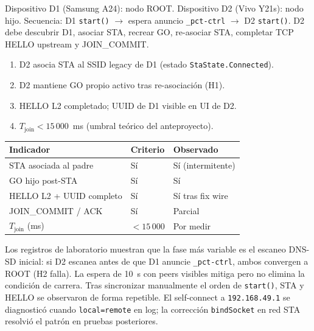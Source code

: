 

Dispositivo D1 (Samsung A24): nodo ROOT. Dispositivo D2 (Vivo Y21s): nodo hijo. Secuencia: D1 \texttt{start()} $\rightarrow$ espera anuncio \texttt{\_pct-ctrl} $\rightarrow$ D2 \texttt{start()}. D2 debe descubrir D1, asociar STA, recrear GO, re-asociar STA, completar TCP HELLO upstream y JOIN\_COMMIT.


\begin{enumerate}
  \item D2 asocia STA al SSID legacy de D1 (estado \texttt{StaState.Connected}).
  \item D2 mantiene GO propio activo tras re-asociación (H1).
  \item HELLO L2 completado; UUID de D1 visible en UI de D2.
  \item $T_{\mathrm{join}} < 15\,000$~ms (umbral teórico del anteproyecto).
\end{enumerate}


\begin{center}
\small
\begin{tabular}{@{}p{4.8cm}p{2.2cm}p{3.2cm}@{}}
\hline
\textbf{Indicador} & \textbf{Criterio} & \textbf{Observado} \\
\hline
STA asociada al padre & Sí & Sí (intermitente) \\
GO hijo post-STA & Sí & Sí \\
HELLO L2 + UUID completo & Sí & Sí tras fix wire \\
JOIN\_COMMIT / ACK & Sí & Parcial \\
$T_{\mathrm{join}}$ (ms) & $<15\,000$ & Por medir \\
\hline
\end{tabular}
\end{center}


Los registros de laboratorio muestran que la fase más variable es el escaneo DNS-SD inicial: si D2 escanea antes de que D1 anuncie \texttt{\_pct-ctrl}, ambos convergen a ROOT (H2 falla). La espera de 10~s con peers visibles mitiga pero no elimina la condición de carrera. Tras sincronizar manualmente el orden de \texttt{start()}, STA y HELLO se observaron de forma repetible. El self-connect a \texttt{192.168.49.1} se diagnosticó cuando \texttt{local=remote} en log; la corrección \texttt{bindSocket} en red STA resolvió el patrón en pruebas posteriores.

